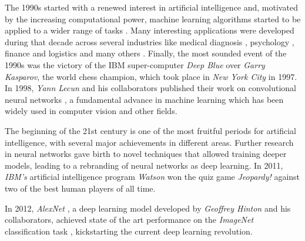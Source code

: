 The 1990s started with a renewed interest in artificial intelligence and, motivated by the increasing computational power, machine learning algorithms started to be applied to a wider range of tasks \autocite{Tesauro:1995}. Many interesting applications were developed during that decade across several industries like medical diagnosis \autocite{declaris1991, Klein1991, punch1992, Cinar1999}, psychology \autocite{Dorrer1995, denby1999, Ogawa1999, Perlovsky1999}, finance and logistics \autocite{Lipshutz1991, Benaroch1991, Johnson1991, Falas1994} and many others \autocite{Smithers1993, Yoo1994, Mashaly1994, Koyma1998}. Finally, the most sounded event of the 1990s was the victory of the IBM super-computer \textit{Deep Blue} \autocite{Campbell2002} over \textit{Garry Kasparov}, the world chess champion, which took place in \textit{New York City} in 1997. In 1998, \textit{Yann Lecun} and his collaborators published their work on convolutional neural networks \autocite{lecun1999}, a fundamental advance in machine learning which has been widely used in computer vision and other fields. 

The beginning of the 21st century is one of the most fruitful periods for artificial intelligence, with several major achievements in different areas. Further research in neural networks \autocite{hinton2006, hinton2012} gave birth to novel techniques that allowed training deeper models, leading to a rebranding of neural networks as deep learning. In 2011, \textit{IBM's} artificial intelligence program \textit{Watson} won the quiz game \textit{Jeopardy!} against two of the best human players of all time. 

In 2012, \textit{AlexNet} \autocite{krizhevsky2012}, a deep learning model developed by \textit{Geoffrey Hinton} and his collaborators, achieved state of the art performance on the \textit{ImageNet} classification task \autocite{ILSVRC15}, kickstarting the current deep learning revolution. 

